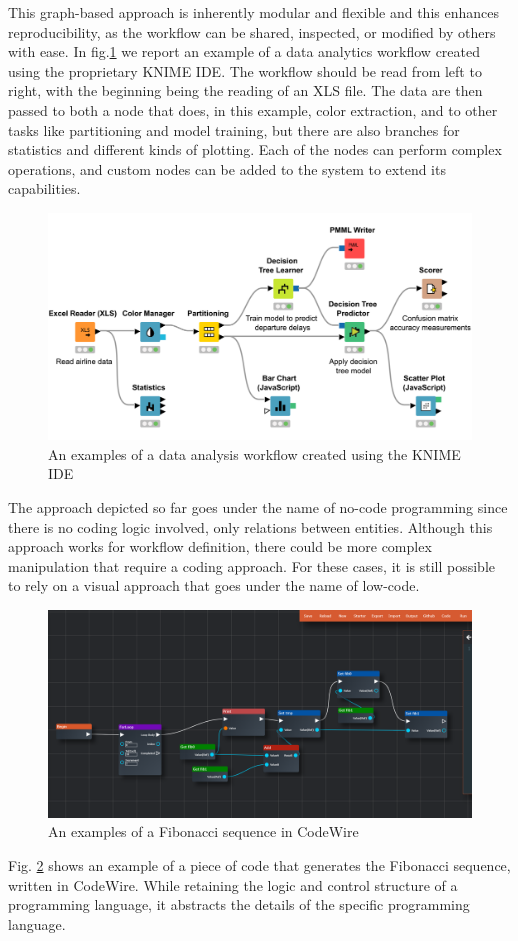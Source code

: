 \documentclass[a4paper,12pt]{article}
\begin{document}
This graph-based approach is inherently modular and flexible and this enhances reproducibility, as the workflow can be shared, inspected, or modified by others with ease.
In fig.\ref{nocode-data} we report an example of a data analytics workflow created using the proprietary KNIME IDE. The workflow should be read from left to right, with the beginning being the reading of an XLS file. The data are then passed to both a node that does, in this example, color extraction, and to other tasks like partitioning and model training, but there are also branches for statistics and different kinds of plotting. Each of the nodes can perform complex operations, and custom nodes can be added to the system to extend its capabilities. 
\begin{figure}
\label{nocode-data}
\includegraphics[width=400pt]{nocode-data.png}
\caption{An examples of a data analysis workflow created using the KNIME IDE}
\end{figure}

The approach depicted so far goes under the name of no-code programming since there is no coding logic involved, only relations between entities. Although this approach works for workflow definition, there could be more complex manipulation that require a coding approach. For these cases, it is still possible to rely on a visual approach that goes under the name of low-code. 
\begin{figure}
\label{lowcode}
\includegraphics[width=400pt]{lowcode.png}
\caption{An examples of a Fibonacci sequence in CodeWire}
\end{figure}
Fig. \ref{lowcode} shows an example of a piece of code that generates the Fibonacci sequence, written in CodeWire. While retaining the logic and control structure of a programming language, it abstracts the details of the specific programming language. 
\end{document}
